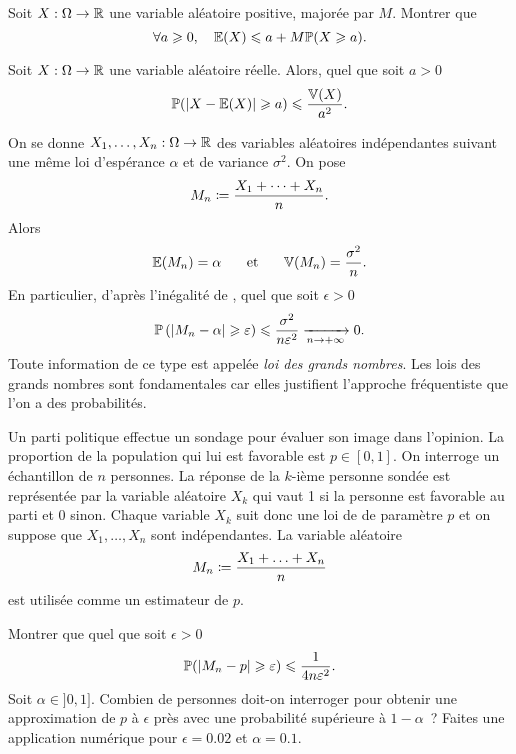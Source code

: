 \documentclass{magnolia}
\begin{document}
\begin{exoUnique}
\exo Soit $X:\Omega\to\mathbb{R}$ une variable aléatoire positive, majorée par $M$. Montrer que
  \[\forall a\geqslant 0,\quad \mathbb{E}(X)\leqslant a+M\mathbb{P}(X\geqslant a).\]
\end{exoUnique}

\begin{proposition}[nom={Inégalité de \nom{Bienaymé-Tchebychev}}]
Soit $X:\Omega\to\mathbb{R}$ une variable aléatoire réelle. Alors, quel que soit $a>0$
\[\mathbb{P}(\left|X-\mathbb{E}(X)\right|\geqslant a)\leqslant\frac{\mathbb{V}(X)}{a^2}.\]
\end{proposition}

\begin{remarqueUnique}
\remarque On se donne
  $X_1,\ldots,X_n:\Omega\to\mathbb{R}$ des variables aléatoires indépendantes suivant une
  même loi d'espérance $\alpha$ et de variance $\sigma^2$. On pose
  \[M_n\coloneqq \frac{X_1+\cdots+X_n}{n}.\]
  Alors 
  \[\mathbb{E}(M_n)=\alpha \quad\quad\!\text{et}\quad\!\quad \mathbb{V}(M_n)=\frac{\sigma^2}{n}.\]
  En particulier, d'après l'inégalité de , quel que soit
  $\epsilon>0$
  \[\mathbb{P}\left(\left|M_n-\alpha\right|\geqslant\varepsilon\right)\leqslant\frac{\sigma^2}{n \varepsilon^2}
    \xrightarrow[n\rightarrow +\infty]{}0.\]
  Toute information de ce type est appelée \emph{loi des grands nombres}. Les lois des
  grands nombres sont fondamentales car elles justifient l'approche fréquentiste que l'on a
  des probabilités. 
\end{remarqueUnique}

\begin{exoUnique}
\exo Un parti politique effectue un sondage pour évaluer son image dans l'opinion. La
  proportion de la population qui lui est favorable est $p\in[0,1]$. On interroge un
  échantillon de $n$ personnes. La réponse de la $k$-ième personne sondée est
  représentée par la variable aléatoire $X_k$ qui vaut 1 si la personne est favorable au
  parti et 0 sinon. Chaque variable $X_k$ suit donc une loi de 
  de paramètre $p$ et on suppose que $X_1,\ldots,X_n$ sont indépendantes.
  La variable aléatoire 
  \[M_n\coloneqq\frac{X_1+\ldots+X_n}{n}\]
  est utilisée comme un estimateur de $p$.
  \begin{questions}
  \question Montrer que quel que soit $\epsilon>0$
    \[\mathbb{P}(\left|M_n-p\right|\geqslant\varepsilon)\leqslant \frac{1}{4n\varepsilon^2}.\]
  \question Soit $\alpha\in]0,1]$. Combien de personnes doit-on interroger pour obtenir une approximation de $p$
    à $\epsilon$ près  avec une probabilité supérieure à $1-\alpha$~? Faites une application
    numérique pour $\epsilon=0.02$ et $\alpha=0.1$.
  \end{questions}
\end{exoUnique}

\end{document}
